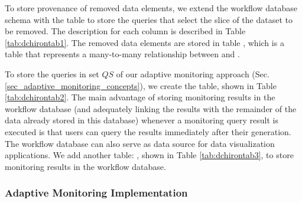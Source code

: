 To
store provenance of removed data elements, we extend the workflow database
schema with the table  to store the queries that select the
slice of the dataset to be removed.
The description for each 
column is described in Table \ref{tab:dchirontab1}.
The removed data elements are stored in table , which is a table that represents a
many-to-many relationship between  and
.





To store the queries in set $QS$ of our adaptive monitoring approach (Sec. \ref{sec_adaptive_monitoring_concepts}), we create the   table, shown in Table \ref{tab:dchirontab2}.
The main advantage of storing
monitoring results in the workflow database (and adequately linking the
results with the remainder of the data already stored in this database)
whenever a monitoring query result is executed is that users can
query the results immediately after their generation. The workflow database
can also serve as data source for data visualization applications. We
add another table: , shown in Table \ref{tab:dchirontab3}, to store
monitoring results in the workflow database.






\subsubsection{Adaptive Monitoring Implementation}
\label{adaptive-monitoring-implementation}

